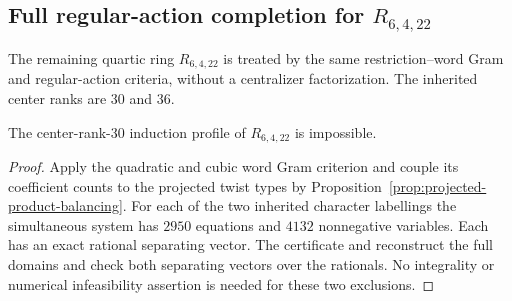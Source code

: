 \subsection{Full regular-action completion for $R_{6,4,22}$}
\label{subsec:frontier-22-completion}

The remaining quartic ring $R_{6,4,22}$ is treated by the same
restriction--word Gram and regular-action criteria, without a centralizer
factorization. The inherited center ranks are $30$ and $36$.

\begin{proposition}
\label{prop:22-rank30}
The center-rank-$30$ induction profile of $R_{6,4,22}$ is impossible.
\end{proposition}
\begin{proof}
Apply the quadratic and cubic word Gram criterion and couple its coefficient
counts to the projected twist types by
Proposition~\ref{prop:projected-product-balancing}. For each of the two
inherited character labellings the simultaneous system has $2950$
equations and $4132$ nonnegative variables. Each has an exact rational
separating vector. The certificate
 and
 reconstruct the full domains and check
both separating vectors over the rationals. No integrality or numerical
infeasibility assertion is needed for these two exclusions.
\end{proof}

